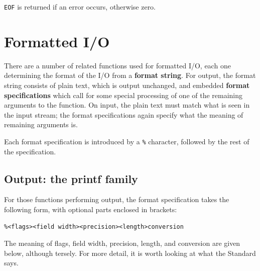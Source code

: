    \texttt{EOF} is returned if an error occurs, otherwise zero.


  

 
        \section{Formatted I/O}\label{sec:formIO}
        

  

  There are a number of related functions used for formatted I/O, each one
   determining the format of the I/O from a \textbf{format string}.  For
   output, the format string consists of plain text, which is output unchanged,
   and embedded \textbf{format specifications} which call for some special
   processing of one of the remaining arguments to the function.  On input, the
   plain text must match what is seen in the input stream; the format
   specifications again specify what the meaning of remaining arguments is.


  Each format specification is introduced by a \texttt{\%} character,
   followed by the rest of the specification.


  \subsection{Output: the printf family}
   

   For those functions performing output, the format
    specification takes the following form, with optional parts
    enclosed in brackets:


   \begin{Verbatim}
%<flags><field width><precision><length>conversion
\end{Verbatim}

   The meaning of flags, field width,
    precision,  length,  and conversion  are
    given  below,  although  tersely.  For more detail, it is worth looking at
    what the Standard says.



